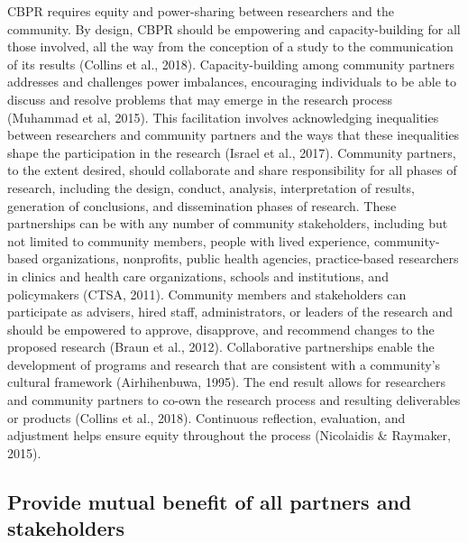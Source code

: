 \documentclass[
  11pt,
]{book}
\begin{document}
CBPR requires equity and power-sharing between researchers and the community. By design, CBPR should be empowering and capacity-building for all those involved, all the way from the conception of a study to the communication of its results (Collins et al., 2018). Capacity-building among community partners addresses and challenges power imbalances, encouraging individuals to be able to discuss and resolve problems that may emerge in the research process (Muhammad et al, 2015). This facilitation involves acknowledging inequalities between researchers and community partners and the ways that these inequalities shape the participation in the research (Israel et al., 2017). Community partners, to the extent desired, should collaborate and share responsibility for all phases of research, including the design, conduct, analysis, interpretation of results, generation of conclusions, and dissemination phases of research. These partnerships can be with any number of community stakeholders, including but not limited to community members, people with lived experience, community-based organizations, nonprofits, public health agencies, practice-based researchers in clinics and health care organizations, schools and institutions, and policymakers (CTSA, 2011). Community members and stakeholders can participate as advisers, hired staff, administrators, or leaders of the research and should be empowered to approve, disapprove, and recommend changes to the proposed research (Braun et al., 2012). Collaborative partnerships enable the development of programs and research that are consistent with a community's cultural framework (Airhihenbuwa, 1995). The end result allows for researchers and community partners to co-own the research process and resulting deliverables or products (Collins et al., 2018). Continuous reflection, evaluation, and adjustment helps ensure equity throughout the process (Nicolaidis \& Raymaker, 2015).

\hypertarget{provide-mutual-benefit-of-all-partners-and-stakeholders}{%
\subsection{Provide mutual benefit of all partners and stakeholders}\label{provide-mutual-benefit-of-all-partners-and-stakeholders}}
\end{document}
